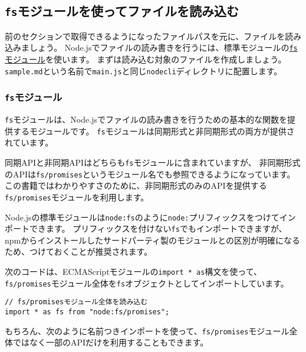 \hypertarget{read-file-by-fs}{%
\subsection{\texorpdfstring{\texttt{fs}モジュールを使ってファイルを読み込む}{fsモジュールを使ってファイルを読み込む}}\label{read-file-by-fs}}

前のセクションで取得できるようになったファイルパスを元に、ファイルを読み込みましょう。
Node.jsでファイルの読み書きを行うには、標準モジュールの\href{https://nodejs.org/api/fs.html}{\texttt{fs}モジュール}を使います。
まずは読み込む対象のファイルを作成しましょう。\texttt{sample.md}という名前で\texttt{main.js}と同じ\texttt{nodecli}ディレクトリに配置します。



\hypertarget{fs-module}{%
\subsubsection{\texorpdfstring{\texttt{fs}モジュール}{fsモジュール}}\label{fs-module}}

\texttt{fs}モジュールは、Node.jsでファイルの読み書きを行うための基本的な関数を提供するモジュールです。
\texttt{fs}モジュールは同期形式と非同期形式の両方が提供されています。

同期APIと非同期APIはどちらも\texttt{fs}モジュールに含まれていますが、
非同期形式のAPIは\texttt{fs/promises}というモジュール名でも参照できるようになっています。
この書籍ではわかりやすさのために、非同期形式のみのAPIを提供する\texttt{fs/promises}モジュールを利用します。

Node.jsの標準モジュールは\texttt{node:fs}のように\texttt{node:}プリフィックスをつけてインポートできます。
プリフィックスを付けない\texttt{fs}でもインポートできますが、npmからインストールしたサードパーティ製のモジュールとの区別が明確になるため、つけておくことが推奨されます。

次のコードは、ECMAScriptモジュールの\texttt{import * as}構文を使って、\texttt{fs/promises}モジュール全体を\texttt{fs}オブジェクトとしてインポートしています。

\begin{lstlisting}
// fs/promisesモジュール全体を読み込む
import * as fs from "node:fs/promises";
\end{lstlisting}

もちろん、次のように名前つきインポートを使って、\texttt{fs/promises}モジュール全体ではなく一部のAPIだけを利用することもできます。

